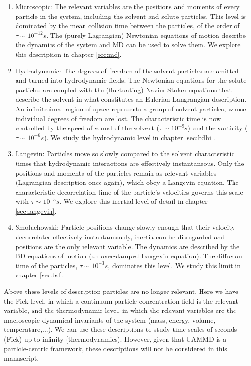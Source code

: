 \documentclass[twoside,openright,titlepage,numbers=noenddot,%
headinclude,footinclude,cleardoublepage=empty,abstract=on,
BCOR=5mm,fontsize=11pt, dvipsnames, paper=b5
]{scrreprt}
\newcommand{\uammd}{\gls{UAMMD}\xspace}
\begin{document}
\begin{enumerate}
\item Microscopic: The relevant variables are the positions and moments of every particle in the system, including the solvent and solute particles. This level is dominated by the mean collision time between the particles, of the order of $\tau \sim 10^{-12} s$. The (purely Lagrangian) Newtonian equations of motion describe the dynamics of the system and \gls{MD} can be used to solve them. We explore this description in chapter \ref{sec:md}.
\item Hydrodynamic: The degrees of freedom of the solvent particles are omitted and turned into hydrodynamic fields. The Newtonian equations for the solute particles are coupled with the (fluctuating) Navier-Stokes equations that describe the solvent in what constitutes an Eulerian-Langrangian description. An infinitesimal region of space represents a group of solvent particles, whose individual degrees of freedom are lost. The characteristic time is now controlled by the speed of sound of the solvent ($\tau \sim 10^{-9}s$) and the vorticity ($\tau \sim 10^{-6}s$). We study the hydrodynamic level in chapter \ref{sec:bdhi}.
\item Langevin: Particles move so slowly compared to the solvent characteristic times that hydrodynamic interactions are effectively instantaneous. Only the positions and momenta of the particles remain as relevant variables (Lagrangian description once again), which obey a Langevin equation. The characteristic decorrelation time of the particle's velocities governs this scale with $\tau\sim 10^{-5}s$. We explore this inertial level of detail in chapter \ref{sec:langevin}.
\item Smoluchowski: Particle positions change slowly enough that their velocity decorrelates effectively instantaneously, inertia can be disregarded and positions are the only relevant variable. The dynamics are described by the \gls{BD} equations of motion (an over-damped Langevin equation). The diffusion time of the particles, $\tau \sim 10^{-3} s$, dominates this level. We study this limit in chapter \ref{sec:bd}.
\end{enumerate}
Above these levels of description particles are no longer relevant. Here we have the Fick level, in which a continuum particle concentration field is the relevant variable, and the thermodynamic level, in which the relevant variables are the macroscopic dynamical invariants of the system (mass, energy, volume, temperature,...). We can use these descriptions to study time scales of seconds (Fick) up to infinity (thermodynamics). However, given that \uammd is a particle-centric framework, these descriptions will not be considered in this manuscript.
\end{document}
